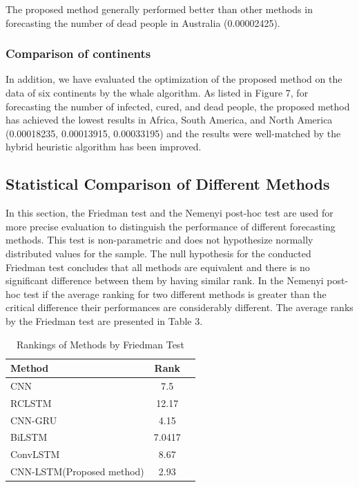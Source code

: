 \documentclass{article}
\begin{document}
The proposed method generally performed better than other methods in forecasting the number of dead people in Australia (0.00002425).

\subsubsection{Comparison of continents}
In addition, we have evaluated the optimization of the proposed method on the data of six continents by the whale algorithm. As listed in Figure 7, for forecasting the number of infected, cured, and dead people, the proposed method has achieved the lowest results in Africa, South America, and North America (0.00018235, 0.00013915, 0.00033195) and the results were well-matched by the hybrid heuristic algorithm has been improved.\\

\subsection{Statistical Comparison of Different Methods}

In this section, the Friedman test and the Nemenyi post-hoc test are used for more precise evaluation to distinguish the performance of different forecasting methods. This test is non-parametric and does not hypothesize normally distributed values for the sample\cite{nemenyi1963distribution}. The null hypothesis for the conducted Friedman test concludes that all methods are equivalent and there is no significant difference between them by having similar rank.  In the Nemenyi post-hoc test if the average ranking for two different methods is greater than the critical difference their performances are considerably different. The average ranks by the Friedman test are presented in Table 3.\\

\begin{table} [b]
    \centering
    \caption{Rankings of Methods by Friedman Test}
    \begin{tabular}{lcl}
        \toprule
        Method & Rank \\
        \midrule
        CNN & 7.5 \\
        RCLSTM & 12.17 \\
        CNN-GRU & 4.15 \\
        BiLSTM & 7.0417 \\
        ConvLSTM & 8.67 \\
        CNN-LSTM(Proposed method) & 2.93 \\
        \bottomrule
    \end{tabular}
\end{table}
\end{document}
